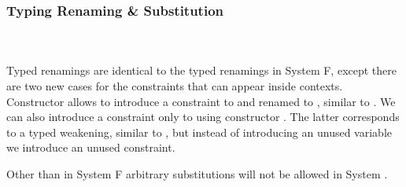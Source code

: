 \subsubsection{Typing Renaming \& Substitution}\hfill\\\\
Typed renamings are identical to the typed renamings in System F, except there are two new cases for the constraints that can appear inside contexts. 
\FoRenTyping
Constructor  allows to introduce a constraint  to  and renamed  to , similar to . We can also introduce a constraint  \Constr{:}  only to  using constructor . 
The latter corresponds to a typed weakening, similar to , but instead of introducing an unused variable we introduce an unused constraint.

\noindent Other than in System F arbitrary substitutions will not be allowed in System \Fo. 
\FoSubTyping

